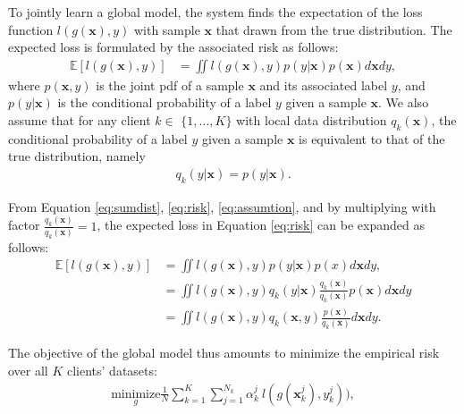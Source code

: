 \documentclass[journal]{IEEEtai}
\newcommand{\x}{\mathbf{x}}
\begin{document}
To jointly learn a global model, the system finds the expectation of the loss function $l(g(\mathbf{x}),y)$ with sample $\x{}$ that drawn from the true distribution. The expected loss is formulated by the associated risk \cite{noauthor_empirical_2021} as follows:
\begin{align}
	\mathbb{E}[l(g(\mathbf{x}),y)] 
	&= \iint l(g(\mathbf{x}),y) p(y|\mathbf{\mathbf{x}}) p(\mathbf{x}) d\mathbf{x}dy, \label{eq:risk} 
\end{align}
where $p(\mathbf{x},y)$ is the joint pdf of a sample $\mathbf{x}$ and its associated label $y$, and $p(y|\mathbf{x})$ is the conditional probability of a label $y$ given a sample $\mathbf{x}$. We also assume that for any client $k \in$ $\{1,...,K\}$ with local data distribution $q_k(\mathbf{x})$, the conditional probability of a label $y$ given a sample $\mathbf{x}$ is equivalent to that of the true distribution, namely
\begin{align}
	\label{eq:assumtion}
	 q_k(y|\mathbf{x}) = p(y|\mathbf{x}).
\end{align}

From Equation \ref{eq:sumdist}, \ref{eq:risk}, \ref{eq:assumtion}, and by multiplying with factor $\frac{q_k(\mathbf{x})}{q_k(\mathbf{x})}=1$, the expected loss in Equation \ref{eq:risk} can be expanded as follows:
\begin{align}
	\mathbb{E}[l(g(\mathbf{x}),y)]  &= \iint l(g(\mathbf{x}),y) p(y|\mathbf{x}) p(x) d\mathbf{x}dy,\\
	&= \iint l(g(\mathbf{x}),y) q_k(y|\mathbf{x}) \frac{q_k(\mathbf{x})}{q_k(\mathbf{x})}  p(\mathbf{x}) d\mathbf{x}dy \\
	&= \iint l(g(\mathbf{x}),y) q_k(\mathbf{x},y) \frac{p(\mathbf{x})}{q_k(\mathbf{x})}  d\mathbf{x}dy.    \label{eq:expectedloss}
\end{align}

The objective of the global model thus amounts to minimize the empirical risk over all $K$ clients' datasets:
\begin{equation}
	\begin{aligned}
	\underset{g}{\text{minimize}}
	 \frac{1}{N}\sum_{k=1}^{K} \sum_{j=1}^{N_k} \alpha_k^j \:l(g(\mathbf{x}_k^j),y_k^j)), \label{eq:optimation}
	\end{aligned}
\end{equation} 
\end{document}
